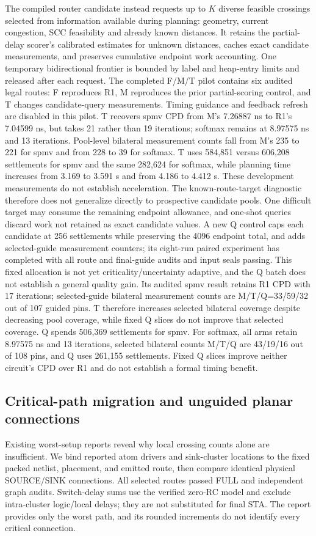 \documentclass[conference,10pt]{IEEEtran}
\begin{document}
The compiled router candidate instead requests up to $K$ diverse feasible crossings selected from information available during planning: geometry, current congestion, SCC feasibility and already known distances. It retains the partial-delay scorer's calibrated estimates for unknown distances, caches exact candidate measurements, and preserves cumulative endpoint work accounting. One temporary bidirectional frontier is bounded by label and heap-entry limits and released after each request. The completed F/M/T pilot contains six audited legal routes: F reproduces R1, M reproduces the prior partial-scoring control, and T changes candidate-query measurements. Timing guidance and feedback refresh are disabled in this pilot. T recovers spmv CPD from M's 7.26887 ns to R1's 7.04599 ns, but takes 21 rather than 19 iterations; softmax remains at 8.97575 ns and 13 iterations. Pool-level bilateral measurement counts fall from M's 235 to 221 for spmv and from 228 to 39 for softmax. T uses 584,851 versus 606,208 settlements for spmv and the same 282,624 for softmax, while planning time increases from 3.169 to 3.591 s and from 4.186 to 4.412 s. These development measurements do not establish acceleration. The known-route-target diagnostic therefore does not generalize directly to prospective candidate pools. One difficult target may consume the remaining endpoint allowance, and one-shot queries discard work not retained as exact candidate values. A new Q control caps each candidate at 256 settlements while preserving the 4096 endpoint total, and adds selected-guide measurement counters; its eight-run paired experiment has completed with all route and final-guide audits and input seals passing. This fixed allocation is not yet criticality/uncertainty adaptive, and the Q batch does not establish a general quality gain. Its audited spmv result retains R1 CPD with 17 iterations; selected-guide bilateral measurement counts are M/T/Q=33/59/32 out of 107 guided pins. T therefore increases selected bilateral coverage despite decreasing pool coverage, while fixed Q slices do not improve that selected coverage. Q spends 506,369 settlements for spmv. For softmax, all arms retain 8.97575 ns and 13 iterations, selected bilateral counts M/T/Q are 43/19/16 out of 108 pins, and Q uses 261,155 settlements. Fixed Q slices improve neither circuit's CPD over R1 and do not establish a formal timing benefit.


\subsection{Critical-path migration and unguided planar connections}
Existing worst-setup reports reveal why local crossing counts alone are insufficient. We bind reported atom drivers and sink-cluster locations to the fixed packed netlist, placement, and emitted route, then compare identical physical SOURCE/SINK connections. All selected routes passed FULL and independent graph audits. Switch-delay sums use the verified zero-RC model and exclude intra-cluster logic/local delays; they are not substituted for final STA. The report provides only the worst path, and its rounded increments do not identify every critical connection.
\end{document}
